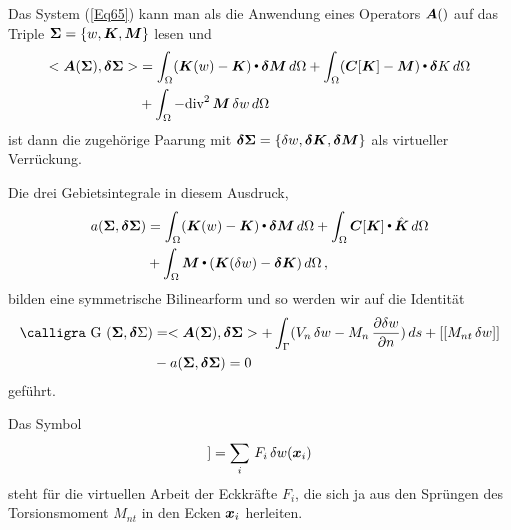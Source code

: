 Das System (\ref{Eq65}) kann man als die Anwendung eines Operators $\mbox{\boldmath $A$}()$ auf das Triple $\mbox{\boldmath $\Sigma$} = \{w, \mbox{\boldmath $K$}, \mbox{\boldmath $M$}\}$ lesen und
\begin{align}
<\mbox{\boldmath $A$}(\mbox{\boldmath $\Sigma$}), \mbox{\boldmath $\delta$}\mbox{\boldmath $\Sigma$}> &= \int_{\Omega} (\mbox{\boldmath $K$}(w) - \mbox{\boldmath $K$}) {\,\scriptscriptstyle \stackrel{\bullet}{{}}}\, \mbox{\boldmath $\delta$}\mbox{\boldmath $M$} \,d\Omega + \int_{\Omega} (\mbox{\boldmath $C$}[\mbox{\boldmath $K$}] - \mbox{\boldmath $M$}){\,\scriptscriptstyle \stackrel{\bullet}{{}}}\,  \mbox{\boldmath $\delta$} K \,d\Omega \nonumber \\
&+ \int_{\Omega} - \text{div}^2\,\mbox{\boldmath $M$} \, \delta w\,d\Omega
\end{align}
ist dann die zugeh\"{o}rige \glq Paarung\grq{} mit  $\mbox{\boldmath $\delta$} \mbox{\boldmath $\Sigma$} = \{\delta w, \mbox{\boldmath $\delta$} \mbox{\boldmath $K$}, \mbox{\boldmath $\delta$} \mbox{\boldmath $M$}\}$ als \glq virtueller Verr\"{u}ckung\grq{}.

Die drei Gebietsintegrale in diesem Ausdruck,
\begin{align}
a(\mbox{\boldmath $\Sigma$}, \mbox{\boldmath $\delta$}\mbox{\boldmath $\Sigma$}) &= \int_{\Omega} (\mbox{\boldmath $K$}(w) - \mbox{\boldmath $K$}) {\,\scriptscriptstyle \stackrel{\bullet}{{}}}\, \mbox{\boldmath $\delta$}\mbox{\boldmath $M$} \,d\Omega + \int_{\Omega}\mbox{\boldmath $C$}[\mbox{\boldmath $K$}] {\,\scriptscriptstyle \stackrel{\bullet}{{}}}\,  \hat{\mbox{\boldmath $K$}}\,d\Omega \nonumber \\
&+ \int_{\Omega} \mbox{\boldmath $M$} {\,\scriptscriptstyle \stackrel{\bullet}{{}}}\, (\mbox{\boldmath $K$}(\delta w) - \mbox{\boldmath $\delta$}\mbox{\boldmath $K$}) \,d\Omega\,,
\end{align}
bilden eine symmetrische Bilinearform und so werden wir auf die Identit\"{a}t
\begin{align}
\text{\normalfont\calligra G\,\,}(\vek \Sigma,\vek  \delta\Sigma) &= <\vek A(\vek \Sigma),\vek  \delta\vek \Sigma> + \int_{\Gamma} (V_n\,\delta w - M_n\,\frac{\partial \delta w}{\partial n}) \,ds + [[M_{nt}\,\delta w]] \nn \\
&- a(\vek \Sigma, \vek  \delta\vek \Sigma) = 0
\end{align}
gef\"{u}hrt.

Das Symbol
\begin{align}
[[M_{nt}\,\delta w]] = \sum_i\,F_i\,\delta w(\vek x_i)
\end{align}
steht f\"{u}r die virtuellen Arbeit der Eckkr\"{a}fte $F_i$, die sich ja aus den Spr\"{u}ngen des Torsionsmoment $M_{nt}$ in den Ecken $\mbox{\boldmath $x$}_i$ herleiten.


